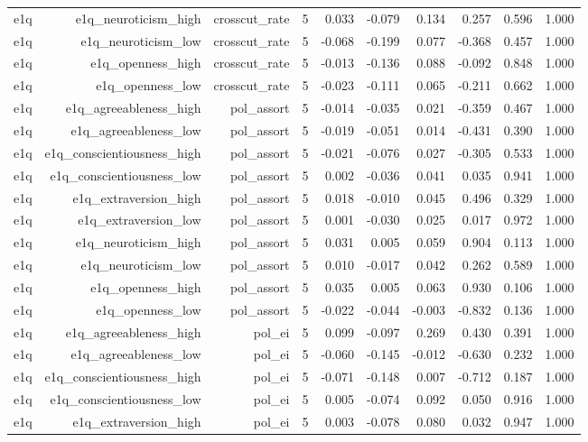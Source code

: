 \documentclass[11pt]{article}
\begin{document}
\begin{landscape}
\begin{longtable}{@{}lrrrrrrrrr@{}}
e1q & e1q\_neuroticism\_high & crosscut\_rate & 5 & 0.033 & -0.079 & 0.134 & 0.257 & 0.596 & 1.000 \\
e1q & e1q\_neuroticism\_low & crosscut\_rate & 5 & -0.068 & -0.199 & 0.077 & -0.368 & 0.457 & 1.000 \\
e1q & e1q\_openness\_high & crosscut\_rate & 5 & -0.013 & -0.136 & 0.088 & -0.092 & 0.848 & 1.000 \\
e1q & e1q\_openness\_low & crosscut\_rate & 5 & -0.023 & -0.111 & 0.065 & -0.211 & 0.662 & 1.000 \\
e1q & e1q\_agreeableness\_high & pol\_assort & 5 & -0.014 & -0.035 & 0.021 & -0.359 & 0.467 & 1.000 \\
e1q & e1q\_agreeableness\_low & pol\_assort & 5 & -0.019 & -0.051 & 0.014 & -0.431 & 0.390 & 1.000 \\
e1q & e1q\_conscientiousness\_high & pol\_assort & 5 & -0.021 & -0.076 & 0.027 & -0.305 & 0.533 & 1.000 \\
e1q & e1q\_conscientiousness\_low & pol\_assort & 5 & 0.002 & -0.036 & 0.041 & 0.035 & 0.941 & 1.000 \\
e1q & e1q\_extraversion\_high & pol\_assort & 5 & 0.018 & -0.010 & 0.045 & 0.496 & 0.329 & 1.000 \\
e1q & e1q\_extraversion\_low & pol\_assort & 5 & 0.001 & -0.030 & 0.025 & 0.017 & 0.972 & 1.000 \\
e1q & e1q\_neuroticism\_high & pol\_assort & 5 & 0.031 & 0.005 & 0.059 & 0.904 & 0.113 & 1.000 \\
e1q & e1q\_neuroticism\_low & pol\_assort & 5 & 0.010 & -0.017 & 0.042 & 0.262 & 0.589 & 1.000 \\
e1q & e1q\_openness\_high & pol\_assort & 5 & 0.035 & 0.005 & 0.063 & 0.930 & 0.106 & 1.000 \\
e1q & e1q\_openness\_low & pol\_assort & 5 & -0.022 & -0.044 & -0.003 & -0.832 & 0.136 & 1.000 \\
e1q & e1q\_agreeableness\_high & pol\_ei & 5 & 0.099 & -0.097 & 0.269 & 0.430 & 0.391 & 1.000 \\
e1q & e1q\_agreeableness\_low & pol\_ei & 5 & -0.060 & -0.145 & -0.012 & -0.630 & 0.232 & 1.000 \\
e1q & e1q\_conscientiousness\_high & pol\_ei & 5 & -0.071 & -0.148 & 0.007 & -0.712 & 0.187 & 1.000 \\
e1q & e1q\_conscientiousness\_low & pol\_ei & 5 & 0.005 & -0.074 & 0.092 & 0.050 & 0.916 & 1.000 \\
e1q & e1q\_extraversion\_high & pol\_ei & 5 & 0.003 & -0.078 & 0.080 & 0.032 & 0.947 & 1.000 \\

\end{longtable}
\end{landscape}
\end{document}
